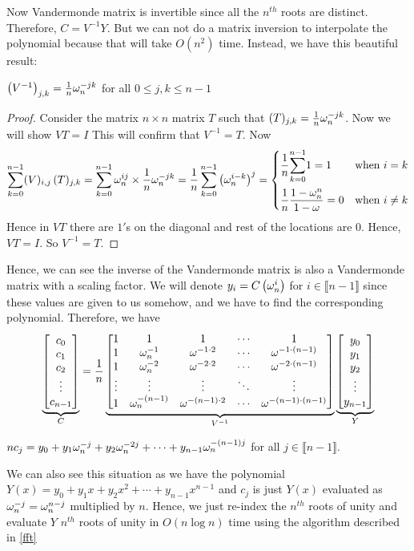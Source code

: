 Now Vandermonde matrix is invertible since all the $n^{th}$ roots are distinct. Therefore, $C=V^{-1}Y$. But we can not do a matrix inversion to interpolate the polynomial because that will take $O(n^2)$ time. Instead, we have this beautiful result:
\begin{lemma}{}{}
	$\left(V^{-1}\right)_{j,k}=\frac1n\omega_n^{-jk}$ for all $0\leq j,k\leq n-1$
\end{lemma}
\begin{proof}
	Consider the matrix $n\times n$ matrix $T$ such that $(T)_{j,k}=\frac1n\omega_n^{-jk}$. Now we will show $VT=I$ This will confirm that $V^{-1}=T$. Now $$\sum_{k=0}^{n-1} (V)_{i,j}\, (T)_{j,k}=\sum_{k=0}^{n-1} \omega^{ij}_n\times \frac1n\omega_n^{-jk}=\frac1n\sum_{k=0}^{n-1}\left(\omega^{i-k}_n\right)^j=\begin{cases}
			\dfrac1n\displaystyle{\sum\limits_{k=0}^{n-1}}1=1 & \text{when $i=k$} \\[5mm] \dfrac1n \dfrac{1-\omega^n_n}{1-\omega} =0 & \text{when $i\neq k$}
		\end{cases} $$Hence in $VT$ there are $1'$s on the diagonal and rest of the locations are $0$. Hence, $VT=I$. So $V^{-1}=T$.
\end{proof}
Hence, we can see the inverse of the Vandermonde matrix is also a Vandermonde matrix with a scaling factor. We will denote $y_i=C\left(\omega_n^{i}\right)$ for $i\in\llbracket n-1\rrbracket$ since these values are given to us somehow, and we have to find the corresponding polynomial. Therefore, we have $$\underbrace{\left[\begin{matrix}c_0\\ c_1\\ c_2\\ \vdots \\ c_{n-1}\end{matrix}\right]}_{C}=\frac1n\underbrace{\left[\begin{matrix}1 & 1 & 1& \cdots & 1\\  1 & \omega^{-1}_n & \omega ^{-1\cdot 2}& \cdots & \omega^{-1\cdot (n-1)}\\ 1 & \omega^{-2}_n & \omega ^{-2\cdot 2}& \cdots & \omega^{-2\cdot (n-1)}\\ \vdots & \vdots & \vdots & \ddots & \vdots\\ 1 & \omega^{-(n-1)}_n & \omega ^{-(n-1)\cdot 2}& \cdots & \omega^{-(n-1)\cdot (n-1)}\end{matrix}\right]}_{V^{-1}}\underbrace{\left[\begin{matrix}y_0\\ y_1\\ y_2\\ \vdots\\ y_{n-1}\end{matrix}\right]}_{Y}$$
\begin{observation*}
	$nc_j=y_0+y_1\omega_n^{-j}+y_2\omega_n^{-2j}+\cdots+y_{n-1}\omega_n^{-(n-1)j}$ for all $j\in\llbracket n-1\rrbracket$.
\end{observation*}
We can also see this situation as we have the polynomial $Y(x)=y_0+y_1x+y_2x^2+\cdots +y_{n-1}x^{n-1}$ and $c_j$ is just $Y(x)$ evaluated as $\omega^{-j}_n=\omega_n^{n-j}$ multiplied by $n$. Hence, we just re-index the $n^{th}$ roots of unity and evaluate $Y$ $n^{th}$ roots of unity in $O(n\log n)$ time using the algorithm described in \autoref{fft}